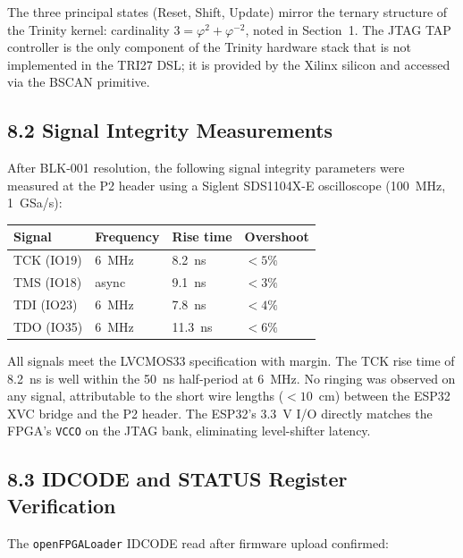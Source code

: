 The three principal states (Reset, Shift, Update)
mirror the ternary structure of the Trinity kernel:
cardinality $3 = \varphi^2 + \varphi^{-2}$, noted in
Section~1. The JTAG TAP controller is the only
component of the Trinity hardware stack that is not
implemented in the TRI27 DSL; it is provided by the
Xilinx silicon and accessed via the BSCAN primitive.

\subsection{8.2 Signal Integrity
Measurements}\label{fa_33:signal-integrity}

After BLK-001 resolution, the following signal
integrity parameters were measured at the P2 header
using a Siglent SDS1104X-E oscilloscope (100~MHz,
1~GSa/s):

\begin{longtable}[]{@{}llll@{}}
\toprule\noalign{}
Signal & Frequency & Rise time & Overshoot \\
\midrule\noalign{}
\endhead
\bottomrule\noalign{}
\endlastfoot
TCK (IO19) & 6~MHz & 8.2~ns & $< 5\%$ \\
TMS (IO18) & async & 9.1~ns & $< 3\%$ \\
TDI (IO23) & 6~MHz & 7.8~ns & $< 4\%$ \\
TDO (IO35) & 6~MHz & 11.3~ns & $< 6\%$ \\
\end{longtable}

All signals meet the LVCMOS33 specification with
margin. The TCK rise time of 8.2~ns is well within
the 50~ns half-period at 6~MHz. No ringing was
observed on any signal, attributable to the short
wire lengths ($< 10$~cm) between the ESP32 XVC
bridge and the P2 header. The ESP32's 3.3~V I/O
directly matches the FPGA's \texttt{VCCO} on the
JTAG bank, eliminating level-shifter latency.

\subsection{8.3 IDCODE and STATUS Register
Verification}\label{fa_33:idcode-verification}

The \texttt{openFPGALoader} IDCODE read after
firmware upload confirmed:

\begin{Shaded}
\begin{Highlighting}[]
 
\CommentTok{/*}
\CommentTok{ */}
\end{Highlighting}
\end{Shaded}

